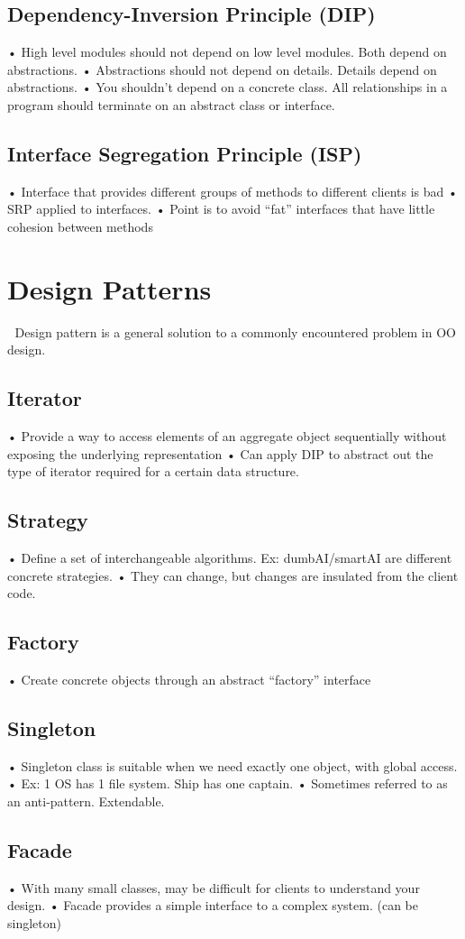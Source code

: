 \documentclass[11pt]{article}
\begin{document}
\subsection{Dependency-Inversion Principle (DIP)}
• High level modules should not depend on low level modules. Both depend on abstractions.
• Abstractions should not depend on details. Details depend on abstractions.
• You shouldn't depend on a concrete class. All relationships in a program should terminate on an
abstract class or interface.
\subsection{Interface Segregation Principle (ISP)}
• Interface that provides different groups of methods to different clients is bad
• SRP applied to interfaces.
• Point is to avoid “fat” interfaces that have little cohesion between methods
\section{Design Patterns}
 Design pattern is a general solution to a commonly encountered problem in OO design.
\subsection{Iterator}
• Provide a way to access elements of an aggregate object sequentially without exposing the
underlying representation
• Can apply DIP to abstract out the type of iterator required for a certain data structure.
\subsection{Strategy}
• Define a set of interchangeable algorithms. Ex: dumbAI/smartAI are different concrete strategies.
• They can change, but changes are insulated from the client code.
\subsection{Factory}
• Create concrete objects through an abstract “factory” interface
\subsection{Singleton}
• Singleton class is suitable when we need exactly one object, with global access.
• Ex: 1 OS has 1 file system. Ship has one captain.
• Sometimes referred to as an anti-pattern. Extendable.
\subsection{Facade}
• With many small classes, may be difficult for clients to understand your design.
• Facade provides a simple interface to a complex system. (can be singleton)
\end{document}
